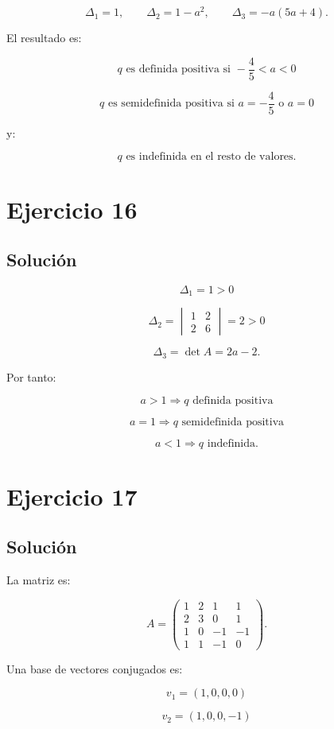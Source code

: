 \documentclass[11pt,a4paper]{article}
\begin{document}
\[
\Delta_1=1,
\qquad
\Delta_2=1-a^2,
\qquad
\Delta_3=-a(5a+4).
\]

El resultado es:

\[
\boxed{
q\text{ es definida positiva si }
-\frac45<a<0
}
\]

\[
\boxed{
q\text{ es semidefinida positiva si }
a=-\frac45
\text{ o }
a=0
}
\]

y:

\[
\boxed{
q\text{ es indefinida en el resto de valores}.
}
\]

\section{Ejercicio 16}
\subsection{Solución}

\[
\Delta_1=1>0
\]

\[
\Delta_2=
\begin{vmatrix}
1&2\\
2&6
\end{vmatrix}
=2>0
\]

\[
\Delta_3
=
\det A
=
2a-2.
\]

Por tanto:

\[
\boxed{
a>1
\Longrightarrow
q\text{ definida positiva}
}
\]

\[
\boxed{
a=1
\Longrightarrow
q\text{ semidefinida positiva}
}
\]

\[
\boxed{
a<1
\Longrightarrow
q\text{ indefinida}.
}
\]

\section{Ejercicio 17}
\subsection{Solución}

La matriz es:

\[
A=
\begin{pmatrix}
1&2&1&1\\
2&3&0&1\\
1&0&-1&-1\\
1&1&-1&0
\end{pmatrix}.
\]

Una base de vectores conjugados es:

\[
v_1=(1,0,0,0)
\]

\[
v_2=(1,0,0,-1)
\]
\end{document}
